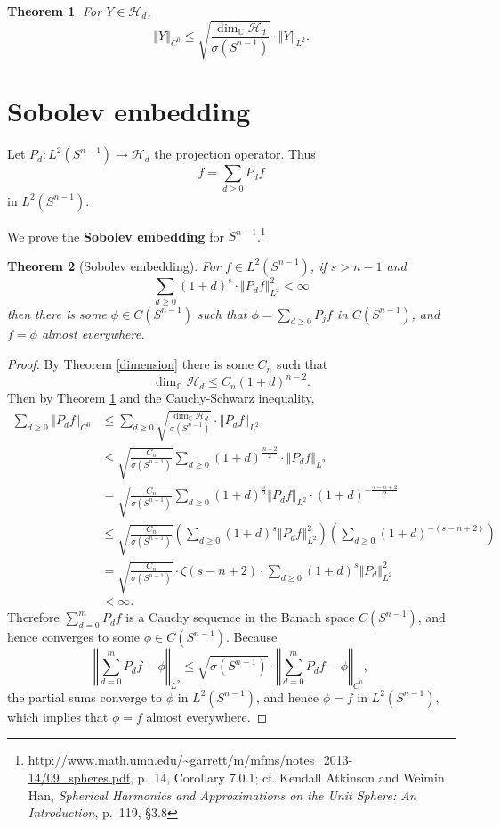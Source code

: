 \documentclass{article}
\newcommand{\norm}[1]{\left\Vert #1 \right\Vert}
\newtheorem{theorem}{Theorem}
\theoremstyle{definition}
\begin{document}
\begin{theorem}
For $Y \in \mathscr{H}_d$,
\[
\norm{Y}_{C^0} \leq \sqrt{\frac{\dim_{\mathbb{C}} \mathscr{H}_d}{\sigma(S^{n-1})}} \cdot \norm{Y}_{L^2}.
\]
\label{nikolsky}
\end{theorem}



\section{Sobolev embedding}
Let $P_d:L^2(S^{n-1}) \to \mathscr{H}_d$  the projection operator.
Thus
\[
f = \sum_{d \geq 0} P_d f
\]
in $L^2(S^{n-1})$.

We prove the \textbf{Sobolev embedding} for $S^{n-1}$.\footnote{\url{http://www.math.umn.edu/~garrett/m/mfms/notes_2013-14/09_spheres.pdf},
p.~14, Corollary 7.0.1;
cf. Kendall Atkinson and Weimin Han, {\em Spherical Harmonics and Approximations on the Unit Sphere: An Introduction},
p.~119, \S 3.8}

\begin{theorem}[Sobolev embedding]
For $f \in L^2(S^{n-1})$, if $s>n-1$ and
\[
\sum_{d \geq 0} (1+d)^s \cdot \norm{P_d f}_{L^2}^2 < \infty
\]
then there is some $\phi \in C(S^{n-1})$ such that  $\phi=\sum_{d \geq 0} P_j f$ in $C(S^{n-1})$, and
$f=\phi$ almost everywhere.
\end{theorem}
\begin{proof}
By Theorem \ref{dimension} there is some $C_n$ such that
\[
\dim_\mathbb{C} \mathscr{H}_d \leq C_n (1+d)^{n-2}.
\]
Then
by Theorem \ref{nikolsky} and the Cauchy-Schwarz inequality,
\begin{align*}
\sum_{d \geq 0} \norm{P_d f}_{C^0}&\leq \sum_{d \geq 0} \sqrt{\frac{\dim_{\mathbb{C}} \mathscr{H}_d}{\sigma(S^{n-1})}} \cdot \norm{P_d f}_{L^2}\\
&\leq \sqrt{\frac{C_n}{\sigma(S^{n-1})}}
\sum_{d \geq 0}  (1+d)^{\frac{n-2}{2}} \cdot \norm{P_d f}_{L^2}\\
&= \sqrt{\frac{C_n}{\sigma(S^{n-1})}}
\sum_{d \geq 0} (1+d)^{\frac{s}{2}} \norm{P_d f}_{L^2} \cdot (1+d)^{-\frac{s-n+2}{2}}\\
&\leq  \sqrt{\frac{C_n}{\sigma(S^{n-1})}} \left(\sum_{d \geq 0} (1+d)^s \norm{P_d f}_{L^2}^2 \right) \left(
\sum_{d \geq 0} (1+d)^{-(s-n+2)}\right)\\
&=   \sqrt{\frac{C_n}{\sigma(S^{n-1})}}  \cdot \zeta(s-n+2) \cdot \sum_{d \geq 0} (1+d)^s \norm{P_d}_{L^2}^2\\
&<\infty.
\end{align*}
Therefore  $\sum_{d=0}^m P_d f$ is a Cauchy sequence in the Banach space $C(S^{n-1})$, 
and hence converges to some $\phi \in C(S^{n-1})$. Because 
\[
\norm{\sum_{d=0}^m P_d f - \phi}_{L^2} \leq 
\sqrt{\sigma(S^{n-1})} \cdot \norm{\sum_{d=0}^m P_d f -\phi}_{C^0},
\]
the partial sums converge to $\phi$ in $L^2(S^{n-1})$, and hence $\phi = f$ in $L^2(S^{n-1})$, which implies that
$\phi=f$ almost everywhere.
\end{proof}
\end{document}
